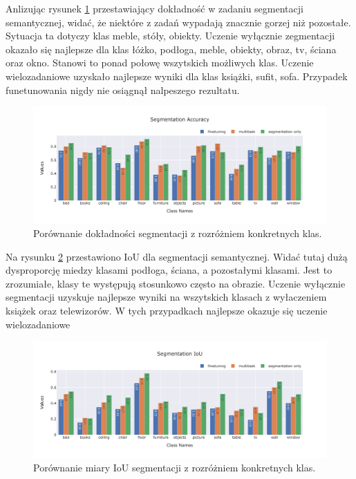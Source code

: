 \vspace{0.5cm}

Anlizując rysunek \ref{fig:segmentation-acc} przestawiający dokładność w zadaniu segmentacji semantycznej, widać, że niektóre z zadań wypadają znacznie gorzej niż pozostałe. Sytuacja ta dotyczy klas meble, stóły, obiekty. Uczenie wyłącznie zegmentacji okazało się najlepsze dla klas łóżko, podłoga, meble, obiekty, obraz, tv, ściana oraz okno. Stanowi to ponad połowę wszytskich możliwych klas. Uczenie wielozadaniowe uzyskało najlepsze wyniki dla klas książki, sufit, sofa. Przypadek funetunowania nigdy nie osiągnął nalpeszego rezultatu.
\begin{figure}[ht!]
    \centering
    \includegraphics[width=\textwidth]{result_imgs_sorted/Segmentation-Accuracy.jpeg}
    \caption{Porównanie dokładności segmentacji z rozróżniem konkretnych klas.}
    \label{fig:segmentation-acc}
\end{figure}

Na rysunku \ref{fig:segmentation-iou} przestawiono IoU dla segmentacji semantycznej. Widać tutaj dużą dysproporcję miedzy klasami podłoga, ściana, a pozostałymi klasami. Jest to zrozumiałe, klasy te występują stosunkowo często na obrazie. Uczenie wyłącznie segmentacji uzyskuje najlepsze wyniki na wszytskich klasach z wyłaczeniem książek oraz telewizorów. W tych przypadkach najlepsze okazuje się uczenie wielozadaniowe
\begin{figure}[ht!]
    \centering
    \includegraphics[width=\textwidth]{result_imgs_sorted/Segmentation-IoU.jpeg}
    \caption{Porównanie miary IoU segmentacji z rozróżniem konkretnych klas.}
    \label{fig:segmentation-iou}
    
\end{figure}

